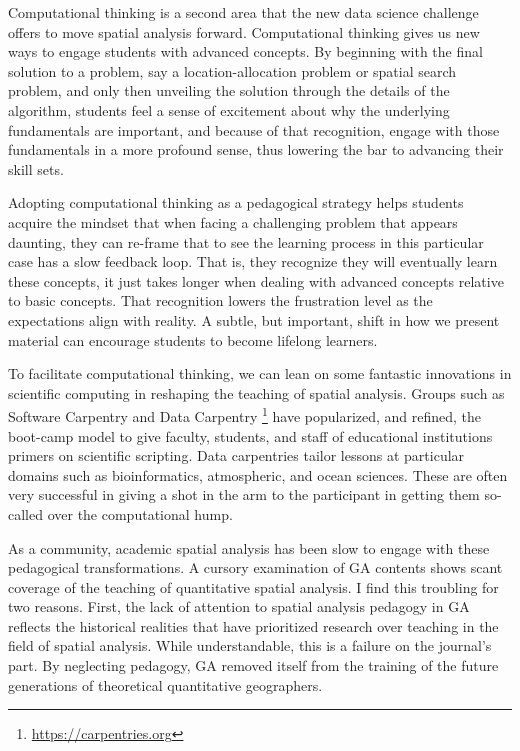 \documentclass[11pt]{article}
\begin{document}
Computational thinking \cite{Barba_2016} is a second area that the new data
science challenge offers to move spatial analysis forward. Computational
thinking gives us new ways to engage students with advanced concepts. By
beginning with the final solution to a problem, say a location-allocation
problem or spatial search problem, and only then unveiling the solution through
the details of the algorithm, students feel a sense of excitement about why the
underlying fundamentals are important, and because of that recognition, engage
with those fundamentals in a more profound sense, thus lowering the bar to
advancing their skill sets.

Adopting computational thinking as a pedagogical strategy helps students
acquire the mindset that when facing a challenging problem that appears
daunting, they can re-frame that to see the learning process in this particular
case has a slow feedback loop. That is, they recognize they will eventually
learn these concepts, it just takes longer when dealing with advanced concepts
relative to basic concepts. That recognition lowers the frustration level
as the expectations align with reality. A subtle, but important,
shift in how we present material can encourage students to become
lifelong learners.

To facilitate computational thinking, we can lean on some fantastic innovations
in scientific computing in reshaping the teaching of spatial analysis. Groups
such as Software Carpentry and Data Carpentry
\footnote{\url{https://carpentries.org}} have popularized, and refined, the
boot-camp model to give faculty, students, and staff of educational institutions
primers on scientific scripting. Data carpentries tailor lessons at particular
domains such as bioinformatics, atmospheric, and ocean sciences. These are often
very successful in giving a shot in the arm to the participant in getting them
so-called over the computational hump.

As a community, academic spatial analysis has been slow to engage with these
pedagogical transformations. A cursory examination of GA contents shows scant
coverage of the teaching of quantitative spatial analysis. I find this troubling
for two reasons. First, the lack of attention to spatial analysis pedagogy in GA
reflects the historical realities  that have prioritized research over teaching in
the field of spatial analysis. While understandable, this is a failure on
the journal's part. By neglecting pedagogy, GA removed itself from the training
of the future generations of theoretical quantitative geographers.
\end{document}
